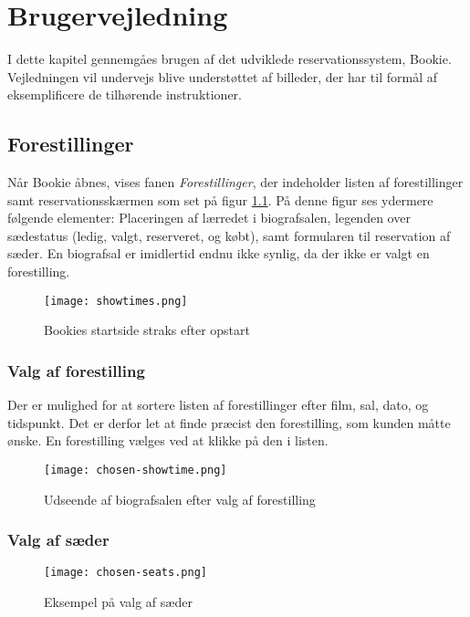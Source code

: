 \chapter{Brugervejledning}

I dette kapitel gennemgåes brugen af det udviklede reservationssystem, Bookie. Vejledningen vil undervejs blive understøttet af billeder, der har til formål af eksemplificere de tilhørende instruktioner.

\section{Forestillinger}

Når Bookie åbnes, vises fanen \textit{Forestillinger}, der indeholder listen af forestillinger samt reservationsskærmen som set på figur \ref{screenshot:bookie}. På denne figur ses ydermere følgende elementer: Placeringen af lærredet i biografsalen, legenden over sædestatus (ledig, valgt, reserveret, og købt), samt formularen til reservation af sæder. En biografsal er imidlertid endnu ikke synlig, da der ikke er valgt en forestilling.

\begin{figure}[h]
  \centering
  \texttt{[image: showtimes.png]}
  \caption{Bookies startside straks efter opstart}
  \label{screenshot:bookie}
\end{figure}

\subsection{Valg af forestilling}

Der er mulighed for at sortere listen af forestillinger efter film, sal, dato, og tidspunkt. Det er derfor let at finde præcist den forestilling, som kunden måtte ønske. En forestilling vælges ved at klikke på den i listen.

\begin{figure}[h]
  \centering
  \texttt{[image: chosen-showtime.png]}
  \caption{Udseende af biografsalen efter valg af forestilling}
  \label{screenshot:chosen-showtime}
\end{figure}

\subsection{Valg af sæder}

\begin{wrapfigure}[4]{r}{0.4\textwidth}
  \centering
  \vspace{-12pt}
  \texttt{[image: chosen-seats.png]}
  \caption{Eksempel på valg af sæder}
  \label{screenshot:chosen-seats}
\end{wrapfigure}

